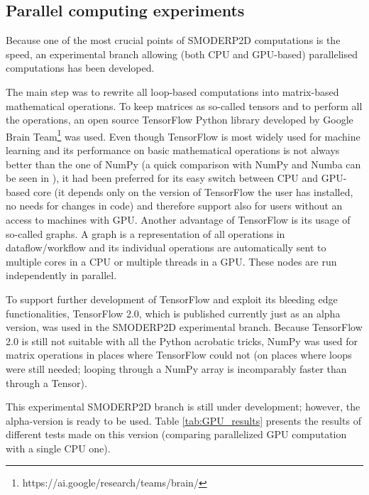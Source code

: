 \subsection{Parallel computing experiments}

Because one of the most crucial points of SMODERP2D computations is
the speed, an experimental branch allowing (both CPU and GPU-based)
parallelised computations has been developed.

The main step was to rewrite all loop-based computations into
matrix-based mathematical operations. To keep matrices as so-called
tensors and to perform all the operations, an open source  TensorFlow Python
library \cite{tensorflow2015-whitepaper} developed by Google Brain
Team\footnote{https://ai.google/research/teams/brain/} was used. Even though
TensorFlow is most widely used for machine learning
and its performance on basic mathematical operations is not always better
than the one of NumPy (a quick comparison with NumPy and Numba can be
seen in \cite{tf-np}), it had been preferred for its easy switch
between CPU and GPU-based core (it depends only on the version of
TensorFlow the user has installed, no needs for changes in code) and
therefore support also for users without an access to machines with
GPU. Another advantage of TensorFlow is its usage of so-called
graphs. A graph is a representation of all operations in
dataflow/workflow and its individual operations are automatically sent
to multiple cores in a CPU or multiple threads in a GPU. These nodes
are run independently in parallel.

To support further development of TensorFlow and exploit its bleeding
edge functionalities, TensorFlow 2.0, which is published currently
just as an alpha version, was used in the SMODERP2D experimental
branch. Because TensorFlow 2.0 is still not suitable with all the
Python acrobatic tricks, NumPy was used for matrix operations in
places where TensorFlow could not (on places where loops were still
needed; looping through a NumPy array is incomparably faster than
through a Tensor).

This experimental SMODERP2D branch is still under development;
however, the alpha-version is ready to be used. Table \ref{tab:GPU_results}
presents the results of different tests made on this version
(comparing parallelized GPU computation with a single CPU one).

